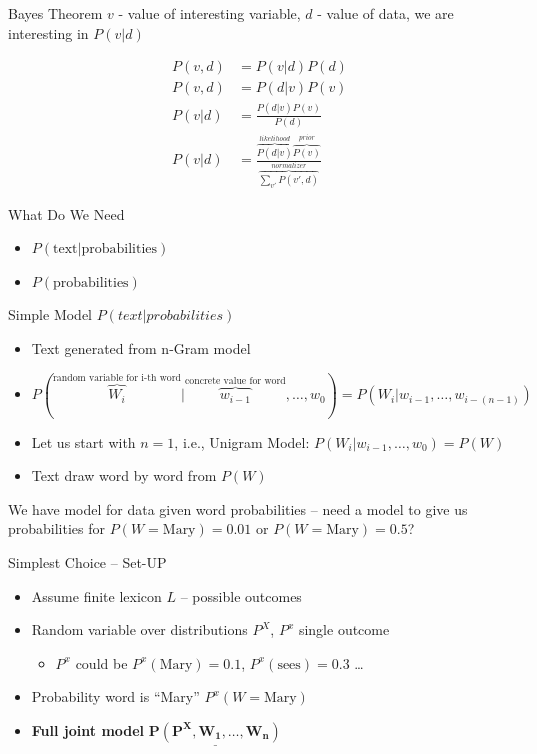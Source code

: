 \documentclass[11pt]{beamer}
\begin{document}
	\begin{frame}{Bayes Theorem}
		$v$ - value of interesting variable, $d$ - value of data, we are interesting in $P(v|d)$
	
		\begin{align*}
			P(v,d) & = P(v|d)P(d) \\
			P(v,d) & = P(d|v)P(v) \\
			P(v|d) & = \frac{P(d|v)P(v)}{P(d)} \\
			P(v|d) & = \frac{\overbrace{P(d|v)}^{likelihood} \overbrace{P(v)}^{prior}}{\overbrace{\sum_{v'} P(v',d)}^{normalizer}}
		\end{align*}
	\end{frame}
	
	\begin{frame}{What Do We Need}
		\begin{itemize}
			\item $P(\text{text} | \text{probabilities})$
			\item $P(\text{probabilities})$
		\end{itemize}
	\end{frame}
	
	\begin{frame}{Simple Model $P(text|probabilities)$}
		\begin{itemize}
			\item Text generated from n-Gram model
			\item $P(\overbrace{W_i}^{\text{random variable for i-th word}}|\overbrace{w_{i-1}}^{\text{concrete value for word}},\dots,w_{0}) = P(W_i|w_{i-1},\dots,w_{i-(n-1)})$
			\item Let us start with $n=1$, i.e., Unigram Model: $P(W_i|w_{i-1},\dots,w_{0}) = P(W)$
			\item Text draw word by word from $P(W)$
		\end{itemize}
		
		\vspace{10pt}We have model for data given word probabilities -- need a model to give us probabilities for $P(W = \text{Mary}) = 0.01$ or $P(W = \text{Mary}) = 0.5$?
	\end{frame}
	
	\begin{frame}{Simplest Choice -- Set-UP}
		\begin{itemize}
			\item Assume finite lexicon $L$ -- possible outcomes
			\item Random variable over distributions $P^X$, $P^x$ single outcome
				\begin{itemize}
					\item $P^x$ could be $P^x(\text{Mary}) = 0.1$, $P^x(\text{sees}) = 0.3$ \dots 
				\end{itemize}
			\item Probability word is ``Mary''  $P^x(W = \text{Mary})$
			\item \textbf{Full joint model} $\mathbf{\underline{P\left( P^{X},W_1,\dots,W_n \right)}}$
		\end{itemize}
	\end{frame}
	
\end{document}
